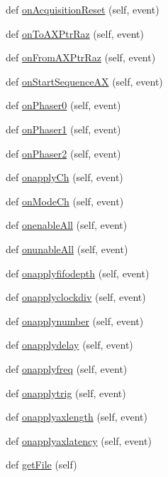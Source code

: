 \begin{DoxyCompactItemize}
\item 
def \hyperlink{classProto40MHz__v1_1_1Proto40MHz__v1_a64caf487900ebef03ab80ae633f8b59e}{on\+Acquisition\+Reset} (self, event)
\item 
def \hyperlink{classProto40MHz__v1_1_1Proto40MHz__v1_a290d939bc88adbfc9dd6d3044b88aa80}{on\+To\+A\+X\+Ptr\+Raz} (self, event)
\item 
def \hyperlink{classProto40MHz__v1_1_1Proto40MHz__v1_a028a01486c07973be1c66d5b632cb58a}{on\+From\+A\+X\+Ptr\+Raz} (self, event)
\item 
def \hyperlink{classProto40MHz__v1_1_1Proto40MHz__v1_a9311a8d74fcc534437715e3ce1bb5dfb}{on\+Start\+Sequence\+AX} (self, event)
\item 
def \hyperlink{classProto40MHz__v1_1_1Proto40MHz__v1_a3c0faa924421f2dc50101373a7d144b9}{on\+Phaser0} (self, event)
\item 
def \hyperlink{classProto40MHz__v1_1_1Proto40MHz__v1_a6ce4bff9a33098821c271c6126d38e87}{on\+Phaser1} (self, event)
\item 
def \hyperlink{classProto40MHz__v1_1_1Proto40MHz__v1_aa6e608163c77fab1034a0d4dd6e07ed3}{on\+Phaser2} (self, event)
\item 
def \hyperlink{classProto40MHz__v1_1_1Proto40MHz__v1_a396ff2e86b0d9f7211b353aa5970bb19}{onapply\+Ch} (self, event)
\item 
def \hyperlink{classProto40MHz__v1_1_1Proto40MHz__v1_ab8ebf6ec8e0154809593d1d3f16ec818}{on\+Mode\+Ch} (self, event)
\item 
def \hyperlink{classProto40MHz__v1_1_1Proto40MHz__v1_a942b2d6f638b5966874437390f11890d}{onenable\+All} (self, event)
\item 
def \hyperlink{classProto40MHz__v1_1_1Proto40MHz__v1_ad140223c54f34dfd64730ccb0140cd81}{onunable\+All} (self, event)
\item 
def \hyperlink{classProto40MHz__v1_1_1Proto40MHz__v1_a294c942e8da1b356e4dfab6c3ac4c4bb}{onapplyfifodepth} (self, event)
\item 
def \hyperlink{classProto40MHz__v1_1_1Proto40MHz__v1_aebb346c0ab965ffe6fa0296a29574253}{onapplyclockdiv} (self, event)
\item 
def \hyperlink{classProto40MHz__v1_1_1Proto40MHz__v1_a93922a09cbaefc409b6018fad42e9da2}{onapplynumber} (self, event)
\item 
def \hyperlink{classProto40MHz__v1_1_1Proto40MHz__v1_a608b5e152da694d561a3e6e7d87a1b44}{onapplydelay} (self, event)
\item 
def \hyperlink{classProto40MHz__v1_1_1Proto40MHz__v1_a5b5aed6590a3c371680928a7d678583e}{onapplyfreq} (self, event)
\item 
def \hyperlink{classProto40MHz__v1_1_1Proto40MHz__v1_a02dd49010273fa59a8964c08aafe94c8}{onapplytrig} (self, event)
\item 
def \hyperlink{classProto40MHz__v1_1_1Proto40MHz__v1_a290b605ea5c60d320cb32d8c9cd94bc8}{onapplyaxlength} (self, event)
\item 
def \hyperlink{classProto40MHz__v1_1_1Proto40MHz__v1_a9cc766ba7ec88bfd62fcb808e9e6a7c3}{onapplyaxlatency} (self, event)
\item 
def \hyperlink{classProto40MHz__v1_1_1Proto40MHz__v1_aaa7351162eec817a5e459af1ed1d6a70}{get\+File} (self)
\end{DoxyCompactItemize}
